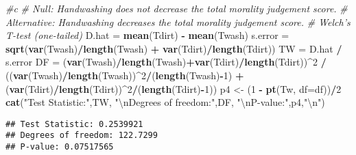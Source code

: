 \documentclass[]{article}
\newenvironment{Shaded}{\begin{snugshade}}{\end{snugshade}}
\newcommand{\CharTok}[1]{\textcolor[rgb]{0.31,0.60,0.02}{#1}}
\newcommand{\CommentTok}[1]{\textcolor[rgb]{0.56,0.35,0.01}{\textit{#1}}}
\newcommand{\DataTypeTok}[1]{\textcolor[rgb]{0.13,0.29,0.53}{#1}}
\newcommand{\DecValTok}[1]{\textcolor[rgb]{0.00,0.00,0.81}{#1}}
\newcommand{\KeywordTok}[1]{\textcolor[rgb]{0.13,0.29,0.53}{\textbf{#1}}}
\newcommand{\NormalTok}[1]{#1}
\newcommand{\OperatorTok}[1]{\textcolor[rgb]{0.81,0.36,0.00}{\textbf{#1}}}
\newcommand{\StringTok}[1]{\textcolor[rgb]{0.31,0.60,0.02}{#1}}
\begin{document}
\begin{Shaded}
\begin{Highlighting}[]
\CommentTok{#c}
\CommentTok{# Null: Handwashing does not decrease the total morality judgement score.}
\CommentTok{# Alternative: Handwashing decreases the total morality judgement score.}
\CommentTok{# Welch's T-test (one-tailed)}
\NormalTok{D.hat =}\StringTok{ }\KeywordTok{mean}\NormalTok{(Tdirt) }\OperatorTok{-}\StringTok{ }\KeywordTok{mean}\NormalTok{(Twash)}
\NormalTok{s.error =}\StringTok{ }\KeywordTok{sqrt}\NormalTok{(}\KeywordTok{var}\NormalTok{(Twash)}\OperatorTok{/}\KeywordTok{length}\NormalTok{(Twash) }\OperatorTok{+}\StringTok{ }\KeywordTok{var}\NormalTok{(Tdirt)}\OperatorTok{/}\KeywordTok{length}\NormalTok{(Tdirt))}
\NormalTok{TW =}\StringTok{ }\NormalTok{D.hat }\OperatorTok{/}\StringTok{ }\NormalTok{s.error}
\NormalTok{DF =}\StringTok{ }\NormalTok{(}\KeywordTok{var}\NormalTok{(Twash)}\OperatorTok{/}\KeywordTok{length}\NormalTok{(Twash)}\OperatorTok{+}\KeywordTok{var}\NormalTok{(Tdirt)}\OperatorTok{/}\KeywordTok{length}\NormalTok{(Tdirt))}\OperatorTok{^}\DecValTok{2} \OperatorTok{/}\StringTok{ }\NormalTok{((}\KeywordTok{var}\NormalTok{(Twash)}\OperatorTok{/}\KeywordTok{length}\NormalTok{(Twash))}\OperatorTok{^}\DecValTok{2}\OperatorTok{/}\NormalTok{(}\KeywordTok{length}\NormalTok{(Twash)}\OperatorTok{-}\DecValTok{1}\NormalTok{) }\OperatorTok{+}\StringTok{ }\NormalTok{(}\KeywordTok{var}\NormalTok{(Tdirt)}\OperatorTok{/}\KeywordTok{length}\NormalTok{(Tdirt))}\OperatorTok{^}\DecValTok{2}\OperatorTok{/}\NormalTok{(}\KeywordTok{length}\NormalTok{(Tdirt)}\OperatorTok{-}\DecValTok{1}\NormalTok{))}
\NormalTok{p4 <-}\StringTok{ }\NormalTok{(}\DecValTok{1} \OperatorTok{-}\StringTok{ }\KeywordTok{pt}\NormalTok{(Tw, }\DataTypeTok{df=}\NormalTok{df))}\OperatorTok{/}\DecValTok{2}
\KeywordTok{cat}\NormalTok{(}\StringTok{"Test Statistic:"}\NormalTok{,TW,}
    \StringTok{"}\CharTok{\textbackslash{}n}\StringTok{Degrees of freedom:"}\NormalTok{,DF,}
    \StringTok{"}\CharTok{\textbackslash{}n}\StringTok{P-value:"}\NormalTok{,p4,}\StringTok{"}\CharTok{\textbackslash{}n}\StringTok{"}\NormalTok{)}
\end{Highlighting}
\end{Shaded}

\begin{verbatim}
## Test Statistic: 0.2539921 
## Degrees of freedom: 122.7299 
## P-value: 0.07517565
\end{verbatim}
\end{document}
